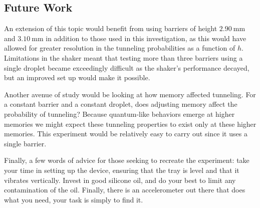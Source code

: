 \subsection*{Future Work}
An extension of this topic would benefit from using barriers of height $2.90~\mathrm{mm}$ and $3.10~\mathrm{mm}$ in addition to those used in this investigation, as this would have allowed for greater resolution in the tunneling probabilities as a function of $h$. Limitations in the shaker meant that testing more than three barriers using a single droplet became exceedingly difficult as the shaker's performance decayed, but an improved set up would make it possible. 

Another avenue of study would be looking at how memory affected tunneling. For a constant barrier and a constant droplet, does adjusting memory affect the probability of tunneling? Because quantum-like behaviors emerge at higher memories we might expect these tunneling properties to exist only at these higher memories. This experiment would be relatively easy to carry out since it uses a single barrier.

Finally, a few words of advice for those seeking to recreate the experiment: take your time in setting up the device, ensuring that the tray is level and that it vibrates vertically. Invest in good silicone oil, and do your best to limit any contamination of the oil. Finally, there is an accelerometer out there that does what you need, your task is simply to find it. 